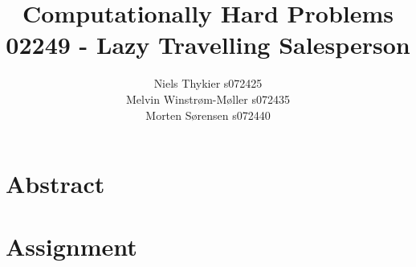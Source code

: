 \documentclass{report}
\title{Computationally Hard Problems 02249 - Lazy Travelling Salesperson}
\author{Niels Thykier s072425\\Melvin Winstrøm-Møller s072435\\Morten Sørensen s072440}
\begin{document}
\parindent 0pt
\parskip 3mm
\setlength{\parindent}{0.5cm}
\newcommand{\docpar}[0]{\vspace{0.5cm} \noindent}
\newcommand{\footref}[1]{\footnotemark[\ref{#1}]}
\newcommand{\newconcept}[1]{\textit{#1}}
\newcommand{\command}[1]{\textbf{#1}}


\maketitle
{}
{}
\tableofcontents
\newpage

\chapter{Abstract}



\chapter{Assignment}












\end{document}
